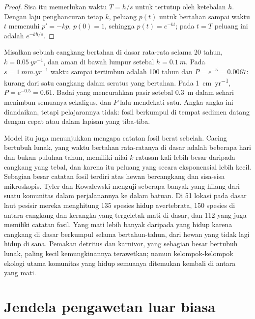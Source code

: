 \begin{proof}
Sisa itu memerlukan waktu $T = h/s$ untuk tertutup oleh ketebalan $h$. Dengan laju
penghancuran tetap $k$, peluang $p(t)$ untuk bertahan sampai waktu $t$ memenuhi $p' = -kp$, $p(0) =
1$, sehingga $p(t) = e^{-kt}$; pada $t = T$ peluang ini adalah $e^{-kh/s}$.
\end{proof}

\begin{example}\label{ex:b2:palaeoenvironments:shell}
Misalkan sebuah cangkang bertahan di dasar rata-rata selama 20 tahun, $k = \qty{0.05}{yr^{-1}}$, dan
aman di bawah lumpur setebal $h = \qty{0.1}{m}$. Pada $s = \qty{1}{mm.yr^{-1}}$ waktu sampai tertimbun adalah 100
tahun dan $P = e^{-5} = 0.0067$: kurang dari satu cangkang dalam seratus yang bertahan. Pada
\qty{1}{cm.yr^{-1}}, $P = e^{-0.5} = 0.61$. Badai yang mencurahkan pasir setebal \qty{0.3}{m} dalam sehari
menimbun semuanya sekaligus, dan $P$ lalu mendekati satu. Angka-angka ini diandaikan, tetapi pelajarannya
tidak: fosil berkumpul di tempat sedimen datang dengan cepat atau dalam lapisan yang tiba-tiba.
\end{example}

Model itu juga menunjukkan mengapa catatan fosil berat sebelah. Cacing bertubuh lunak, yang waktu bertahan rata-ratanya di
dasar adalah beberapa hari dan bukan puluhan tahun, memiliki nilai $k$ ratusan kali lebih besar daripada cangkang yang tebal,
dan karena itu peluang yang secara eksponensial lebih kecil. Sebagian besar catatan fosil terdiri atas hewan
bercangkang dan sisa-sisa mikroskopis. Tyler dan Kowalewski menguji seberapa banyak yang hilang dari suatu komunitas dalam
perjalanannya ke dalam batuan. Di 51 lokasi pada dasar laut pesisir mereka menghitung 135 spesies hidup
avertebrata, 150 spesies di antara cangkang dan kerangka yang tergeletak mati di dasar, dan 112 yang
juga memiliki catatan fosil. Yang mati lebih banyak daripada yang hidup karena cangkang di dasar berkumpul
selama bertahun-tahun, dari hewan yang tidak lagi hidup di sana. Pemakan detritus dan karnivor, yang sebagian besar
bertubuh lunak, paling kecil kemungkinannya terawetkan; namun kelompok-kelompok ekologi utama komunitas yang hidup
semuanya ditemukan kembali di antara yang mati.

\section{Jendela pengawetan luar biasa}\label{sec:b2:palaeoenvironments:lagerstatten}


